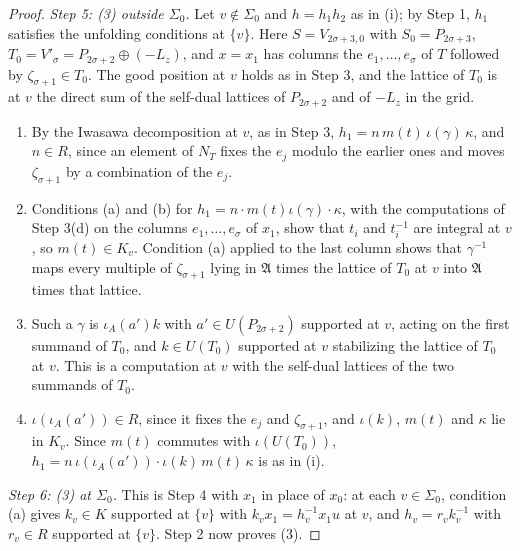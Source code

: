 \begin{proof}
\emph{Step 5: (3) outside $\Sigma_0$.} Let $v\notin\Sigma_0$ and $h=h_1h_2$ as
in (i); by Step 1, $h_1$ satisfies the unfolding conditions at $\{v\}$. Here
$S=V_{2\sigma+3,0}$ with $S_0=P_{2\sigma+3}$,
$T_0=V'_\sigma=P_{2\sigma+2}\oplus(-L_z)$, and $x=x_1$ has columns the
$e_1,\ldots,e_\sigma$ of $T$ followed by $\zeta_{\sigma+1}\in T_0$. The good
position at $v$ holds as in Step 3, and the lattice of $T_0$ is at $v$ the direct
sum of the self-dual lattices of $P_{2\sigma+2}$ and of $-L_z$ in the grid.
\begin{enumerate}
\item[(a)] By the Iwasawa decomposition at $v$, as in Step 3,
  $h_1=n\,m(t)\,\iota(\gamma)\,\kappa$, and $n\in R$, since an element of $N_T$
  fixes the $e_j$ modulo the earlier ones and moves $\zeta_{\sigma+1}$ by a
  combination of the $e_j$.
\item[(b)] Conditions (a) and (b) for
  $h_1=n\cdot m(t)\iota(\gamma)\cdot\kappa$, with the computations of
  Step 3(d) on the columns $e_1,\ldots,e_\sigma$ of $x_1$, show that $t_i$ and
  $t_i^{-1}$ are integral at $v$, so $m(t)\in K_v$. Condition (a) applied to
  the last column shows that $\gamma^{-1}$ maps every multiple of
  $\zeta_{\sigma+1}$ lying in $\mathfrak A$ times the lattice of $T_0$ at $v$
  into $\mathfrak A$ times that lattice.
\item[(c)] Such a $\gamma$ is $\iota_A(a')k$ with $a'\in U(P_{2\sigma+2})$
  supported at $v$, acting on the first summand of $T_0$, and $k\in U(T_0)$
  supported at $v$ stabilizing the lattice of $T_0$ at $v$. This is a computation
  at $v$ with the self-dual lattices of the two summands of $T_0$.
\item[(d)] $\iota(\iota_A(a'))\in R$, since it fixes the $e_j$ and
  $\zeta_{\sigma+1}$, and $\iota(k)$, $m(t)$ and $\kappa$ lie in $K_v$. Since
  $m(t)$ commutes with $\iota(U(T_0))$,
  $h_1=n\,\iota(\iota_A(a'))\cdot\iota(k)\,m(t)\,\kappa$ is as in (i).
\end{enumerate}

\emph{Step 6: (3) at $\Sigma_0$.} This is Step 4 with $x_1$ in place of $x_0$: at
each $v\in\Sigma_0$, condition (a) gives $k_v\in K$ supported at $\{v\}$ with
$k_vx_1=h_v^{-1}x_1u$ at $v$, and $h_v=r_vk_v^{-1}$ with $r_v\in R$ supported at
$\{v\}$. Step 2 now proves (3).
\end{proof}

